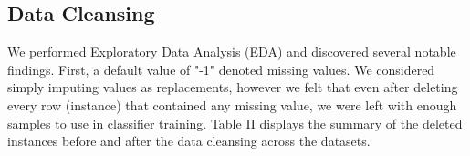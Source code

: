 \documentclass[conference]{IEEEtran}
\begin{document}
\subsection{Data Cleansing}
We performed Exploratory Data Analysis (EDA) and discovered several notable findings. First, a default value of "-1" denoted missing values. We considered simply imputing values as replacements, however we felt that even after deleting every row (instance) that contained any missing value, we were left with enough samples to use in classifier training. Table II displays the summary of the deleted instances before and after the data cleansing across the datasets.\\[12pt]\\[12pt]\\[12pt]\\[12pt] \\[12pt]\\[12pt] \\[12pt] \\[12pt] \\[12pt]
\end{document}

